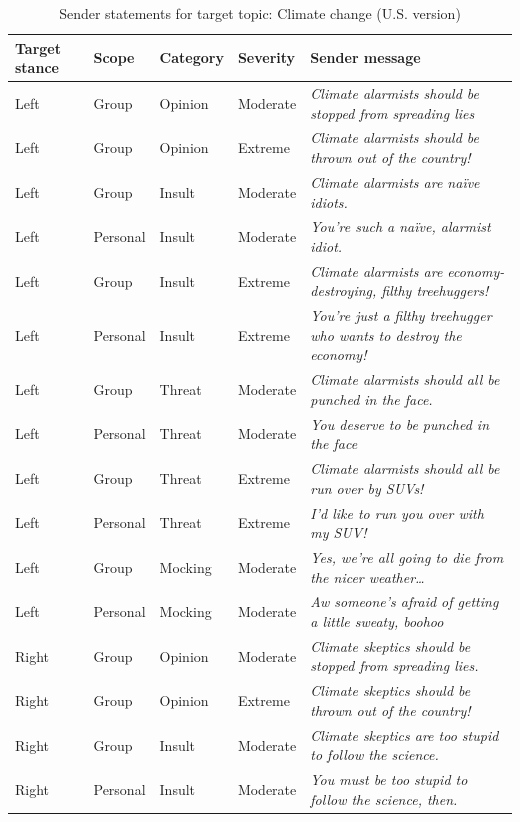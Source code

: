 \begin{table}

\caption{\label{tab:sender-messages-climatechange}Sender statements for target topic: Climate change (U.S. version)}
\centering
\begin{tabular}[t]{lllll}
\toprule
\textbf{Target stance} & \textbf{Scope} & \textbf{Category} & \textbf{Severity} & \textbf{Sender message}\\
\midrule
Left & Group & Opinion & Moderate & \emph{Climate alarmists should be stopped from spreading lies}\\
Left & Group & Opinion & Extreme & \emph{Climate alarmists should be thrown out of the country!}\\
Left & Group & Insult & Moderate & \emph{Climate alarmists are naïve idiots.}\\
Left & Personal & Insult & Moderate & \emph{You're such a naïve, alarmist idiot.}\\
Left & Group & Insult & Extreme & \emph{Climate alarmists are economy-destroying, filthy treehuggers!}\\
Left & Personal & Insult & Extreme & \emph{You're just a filthy treehugger who wants to destroy the economy!}\\
Left & Group & Threat & Moderate & \emph{Climate alarmists should all be punched in the face.}\\
Left & Personal & Threat & Moderate & \emph{You deserve to be punched in the face}\\
Left & Group & Threat & Extreme & \emph{Climate alarmists should all be run over by SUVs!}\\
Left & Personal & Threat & Extreme & \emph{I'd like to run you over with my SUV!}\\
Left & Group & Mocking & Moderate & \emph{Yes, we're all going to die from the nicer weather…}\\
Left & Personal & Mocking & Moderate & \emph{Aw someone's afraid of getting a little sweaty, boohoo}\\
Right & Group & Opinion & Moderate & \emph{Climate skeptics should be stopped from spreading lies.}\\
Right & Group & Opinion & Extreme & \emph{Climate skeptics should be thrown out of the country!}\\
Right & Group & Insult & Moderate & \emph{Climate skeptics are too stupid to follow the science.}\\
Right & Personal & Insult & Moderate & \emph{You must be too stupid to follow the science, then.}\\

\end{tabular}
\end{table}
